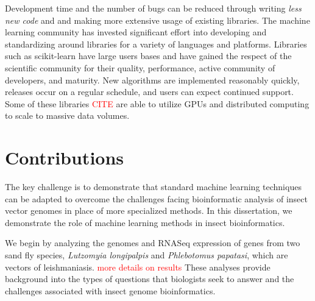 Development time and the number of bugs can be reduced through writing \emph{less new code} and and making more extensive usage of existing libraries. The machine learning community has invested significant effort into developing and standardizing around libraries for a variety of languages and platforms.  Libraries such as scikit-learn \cite{scikit-learn} have large users bases and have gained the respect of the scientific community for their quality, performance, active community of developers, and maturity. New algorithms are implemented reasonably quickly, releases occur on a regular schedule, and users can expect continued support.  Some of these libraries \textcolor{red}{CITE} are able to utilize GPUs and distributed computing to scale to massive data volumes.

\section{Contributions}
The key challenge is to demonstrate that standard machine learning techniques can be adapted to overcome the challenges facing bioinformatic analysis of insect vector genomes in place of more specialized methods.  In this dissertation, we demonstrate the role of machine learning methods in insect bioinformatics. 

We begin by analyzing the genomes and RNASeq expression of genes from two sand fly species, \emph{Lutzomyia longipalpis} and \emph{Phlebotomus papatasi}, which are vectors of leishmaniasis. \textcolor{red}{more details on results} These analyses provide background into the types of questions that biologists seek to answer and the challenges associated with insect genome bioinformatics.

